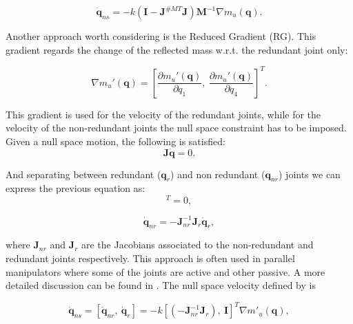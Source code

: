 \begin{equation}
	\mathbf{\dot{q}}_{ns} =  - k (\mathbf{I} -  \mathbf{J}^{\#MT} \mathbf{J} ) \mathbf{M}^{-1} \nabla {m}_u(\mathbf{q}). \label{eq:RG_dq_nemec}
\end{equation}






Another approach worth considering is the Reduced Gradient (RG). 
This gradient regards the change of the reflected mass w.r.t. the redundant joint only:

\begin{equation}
\nabla m_u'(\mathbf{q}) = \left[
\frac{\partial {m_u'(\mathbf{q})}}{\partial {q_1}}, \   \frac{\partial {m_u'(\mathbf{q})}}{\partial {q_4}} \right]^{T}. \label{eq:grad_refl_mass_RG}
\end{equation}

This gradient is used for the velocity of the redundant joints, while for the velocity of the non-redundant joints the null space constraint has to be imposed. Given a null space motion, the following is satisfied:
\begin{equation}
\mathbf{J} \dot{\mathbf{q}} = 0 .
\label{eq:ns_motion}
\end{equation}

And separating between redundant (${\mathbf{q}}_{r}$) and non redundant (${\mathbf{q}}_{nr}$) joints we can express the previous equation as:
\begin{equation}
[\mathbf{J}_r, \ \mathbf{J}_{nr}] [\mathbf{\dot{q}}_r, \  \dot{\mathbf{q}}_{nr}]^T = 0    ,
\label{eq:}
\end{equation}

\begin{equation}
\dot{\mathbf{q}}_{nr} =  - \mathbf{J}_{nr}^{-1} \mathbf{J}_r \mathbf{\dot{q}}_r    ,
\label{eq:ns_constraint}
\end{equation}

where $\mathbf{J}_{nr}$ and $\mathbf{J}_{r}$ are the Jacobians associated to the non-redundant and redundant joints respectively. This approach is often used in parallel manipulators where some of the joints are active and other passive. A more detailed discussion can be found in \cite{Murray:1994:MIR:561828}. The null space velocity defined by \cite{reduced_gradient} is

\begin{equation}
\mathbf{\dot{q}}_{ns} = \left[\mathbf{\dot{q}}_{nr}, \  \mathbf{\dot{q}}_{r} \right ] 
= - k \left[(-\mathbf{J}_{nr}^{-1} \mathbf{J}_r), \    \mathbf{I} \right ]^{T}  \nabla m'_u(\mathbf{q}),
\label{eq:ns_velocity_RG}
\end{equation}


